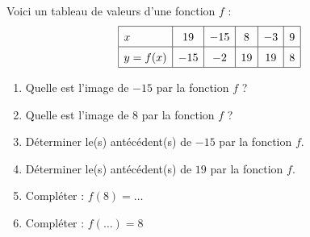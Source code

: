 \documentclass[main.tex]{subfiles}
\begin{document}
\begin{example}\hfill 
	
	Voici un tableau de valeurs d'une fonction $f$ :  
	$$\def\arraystretch{1.5}\begin{array}{|l|c|c|c|c|c|}
		\hline
		x & 19 & -15 & 8 & -3 & 9 \\
		\hline
		y=f(x) & -15 & -2 & 19 & 19 & 8 \\
		\hline
	\end{array}
	$$
	\begin{enumerate}
		\item Quelle est l'image de $-15$ par la fonction $f$ ?
		\item Quelle est l'image de $8$ par la fonction $f$ ?
		\item Déterminer le(s) antécédent(s) de $-15$ par la fonction $f$.
		\item Déterminer le(s) antécédent(s) de $19$ par la fonction $f$.
		\item Compléter : $f(8)=\ldots$
		\item Compléter : $f(\ldots)=8$
	\end{enumerate}
\end{example}
\end{document}
